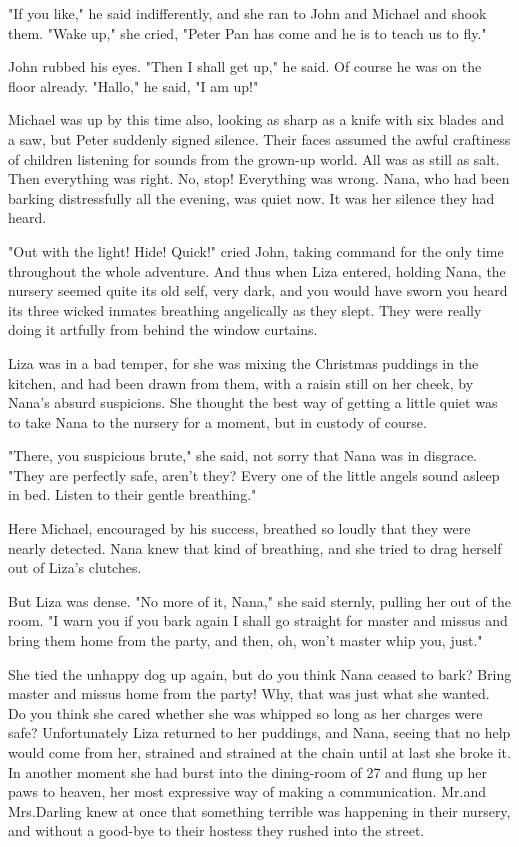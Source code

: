 "If you like," he said indifferently, and she ran to John and Michael and shook them.
"Wake up," she cried, "Peter Pan has come and he is to teach us to fly."

John rubbed his eyes.
"Then I shall get up," he said.
Of course he was on the floor already.
"Hallo," he said, "I am up!"

Michael was up by this time also, looking as sharp as a knife with six blades and a saw, but Peter suddenly signed silence.
Their faces assumed the awful craftiness of children listening for sounds from the grown-up world.
All was as still as salt.
Then everything was right.
No, stop!
Everything was wrong.
Nana, who had been barking distressfully all the evening, was quiet now.
It was her silence they had heard.

"Out with the light!
Hide!
Quick!\@" cried John, taking command for the only time throughout the whole adventure.
And thus when Liza entered, holding Nana, the nursery seemed quite its old self, very dark, and you would have sworn you heard its three wicked inmates breathing angelically as they slept.
They were really doing it artfully from behind the window curtains.

Liza was in a bad temper, for she was mixing the Christmas puddings in the kitchen, and had been drawn from them, with a raisin still on her cheek, by Nana's absurd suspicions.
She thought the best way of getting a little quiet was to take Nana to the nursery for a moment, but in custody of course.

"There, you suspicious brute," she said, not sorry that Nana was in disgrace.
"They are perfectly safe, aren't they?
Every one of the little angels sound asleep in bed.
Listen to their gentle breathing."

Here Michael, encouraged by his success, breathed so loudly that they were nearly detected.
Nana knew that kind of breathing, and she tried to drag herself out of Liza's clutches.

But Liza was dense.
"No more of it, Nana," she said sternly, pulling her out of the room.
"I warn you if you bark again I shall go straight for master and missus and bring them home from the party, and then, oh, won't master whip you, just."

She tied the unhappy dog up again, but do you think Nana ceased to bark?
Bring master and missus home from the party!
Why, that was just what she wanted.
Do you think she cared whether she was whipped so long as her charges were safe?
Unfortunately Liza returned to her puddings, and Nana, seeing that no help would come from her, strained and strained at the chain until at last she broke it.
In another moment she had burst into the dining-room of 27 and flung up her paws to heaven, her most expressive way of making a communication.
Mr.\@ and Mrs.\@ Darling knew at once that something terrible was happening in their nursery, and without a good-bye to their hostess they rushed into the street.

